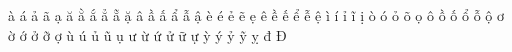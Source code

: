 \documentclass[12pt,a4paper]{article}
\begin{document}
à á ả ã ạ ă ằ ắ ẳ ẵ ặ â ầ ấ ẩ ẫ ậ
è é ẻ ẽ ẹ ê ề ế ể ễ ệ
ì í ỉ ĩ ị
ò ó ỏ õ ọ ô ồ ố ổ ỗ ộ ơ ờ ớ ở ỡ ợ
ù ú ủ ũ ụ ư ừ ứ ử ữ ự
ỳ ý ỷ ỹ ỵ đ Đ
\end{document}
